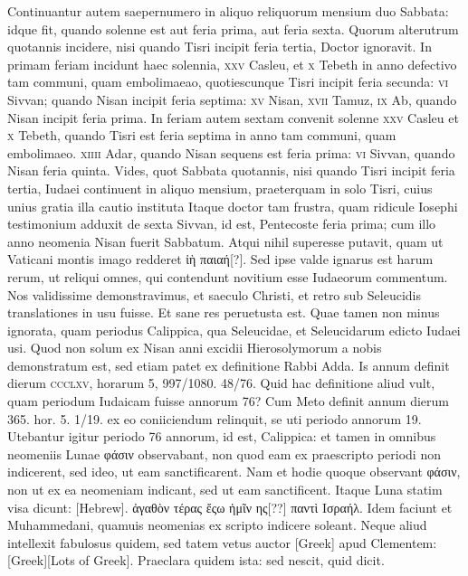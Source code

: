 Continuantur autem saepernumero in aliquo reliquorum mensium
duo Sabbata: idque fit, quando solenne est aut feria prima, aut feria
sexta.
Quorum alterutrum quotannis incidere, nisi quando Tisri
incipit feria tertia, Doctor ignoravit.
In primam feriam incidunt
haec solennia, \textsc{xxv} Casleu, et \textsc{x} Tebeth in anno defectivo tam
communi, quam embolimaeao, quotiescunque Tisri incipit feria secunda:
\textsc{vi} Sivvan; quando Nisan incipit feria septima:
\textsc{xv} Nisan, \textsc{xvii} Tamuz,
\textsc{ix} Ab, quando Nisan incipit feria prima.
In feriam autem sextam
convenit solenne \textsc{xxv} Casleu et
 \textsc{x} Tebeth, quando Tisri est feria
septima in anno tam communi, quam embolimaeo.
\textsc{xiiii} Adar, quando
Nisan sequens est feria prima: \textsc{vi} Sivvan, quando Nisan feria quinta.
Vides, quot Sabbata quotannis, nisi quando Tisri incipit
 feria tertia, Iudaei
continuent in aliquo mensium, praeterquam in solo Tisri, cuius
unius gratia illa cautio instituta
Itaque doctor tam frustra, quam ridicule
Iosephi testimonium adduxit de sexta Sivvan, id est, Pentecoste
feria prima; cum illo anno neomenia Nisan fuerit Sabbatum.
Atqui
nihil superesse putavit, quam ut Vaticani montis imago redderet
\textgreek{ἰὴ παιαή[?]}.
Sed ipse valde ignarus est harum rerum, ut reliqui omnes,
qui contendunt novitium esse Iudaeorum commentum.
Nos
validissime demonstravimus, et saeculo Christi, et retro sub Seleucidis
translationes in usu fuisse.
Et sane res peruetusta est.
Quae tamen
non minus ignorata, quam periodus Calippica, qua Seleucidae, et
Seleucidarum edicto Iudaei usi.
Quod non solum ex Nisan anni excidii
Hierosolymorum a nobis demonstratum est, sed etiam patet
ex definitione Rabbi Adda.
Is annum definit dierum \textsc{ccclxv},
horarum 5, 997/1080. 48/76.
Quid hac definitione aliud vult, quam periodum
Iudaicam fuisse annorum 76?
Cum Meto definit annum dierum
365. hor. 5. 1/19. ex eo coniiciendum relinquit, se uti periodo annorum
19.
Utebantur igitur periodo 76 annorum, id est, Calippica:
et tamen in omnibus neomeniis Lunae \textgreek{φάσιν} observabant, non
quod eam ex praescripto periodi non indicerent, sed ideo, ut eam
sanctificarent.
Nam et hodie quoque observant \textgreek{φάσιν}, non ut ex ea
neomeniam indicant, sed ut eam sanctificent.
Itaque Luna statim
visa dicunt: \texthebrew{[Hebrew]}.
\textgreek{ἀγαθὸν τέρας ἔςω ἡμῖν ης[??] παντὶ Ισραήλ.}
Idem faciunt et Muhammedani, quamuis neomenias ex
scripto indicere soleant.
Neque aliud intellexit fabulosus quidem,
sed tatem vetus auctor \textgreek{[Greek]} apud Clementem:
\textgreek{[Greek][Lots of Greek]}.
{}
Praeclara quidem ista: sed nescit, quid dicit.


